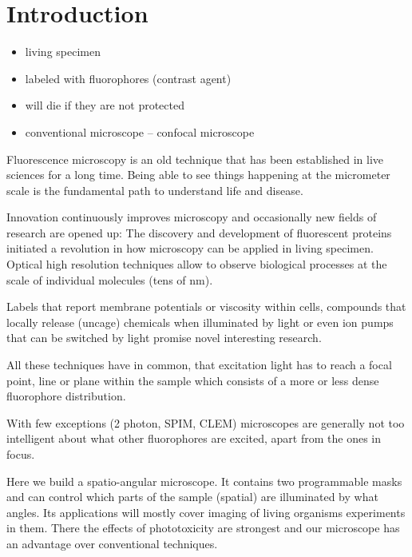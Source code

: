 \chapter{Introduction}
\begin{itemize}
\item living specimen
\item labeled with fluorophores (contrast agent)
\item will die if they are not protected
\item conventional microscope -- confocal microscope
\end{itemize}
Fluorescence microscopy is an old technique that has been established
in live sciences for a long time. Being able to see things happening
at the micrometer scale is the fundamental path to understand life and
disease.

Innovation continuously improves microscopy and occasionally new
fields of research are opened up: The discovery and development of
fluorescent proteins initiated a revolution in how microscopy can be
applied in living specimen. Optical high resolution techniques allow
to observe biological processes at the scale of individual molecules
(tens of nm). 

Labels that report membrane potentials or viscosity within cells,
compounds that locally release (uncage) chemicals when illuminated by
light or even ion pumps that can be switched by light promise novel
interesting research.

All these techniques have in common, that excitation light has to
reach a focal point, line or plane within the sample which consists of
a more or less dense fluorophore distribution.

With few exceptions (2 photon, SPIM, CLEM) microscopes are generally not too
intelligent about what other fluorophores are excited, apart from the
ones in focus.

Here we build a spatio-angular microscope. It contains two
programmable masks and can control which parts of the sample (spatial)
are illuminated by what angles. Its applications will mostly cover
imaging of living organisms experiments in them. There the effects of
phototoxicity are strongest and our microscope has an advantage over
conventional techniques.
